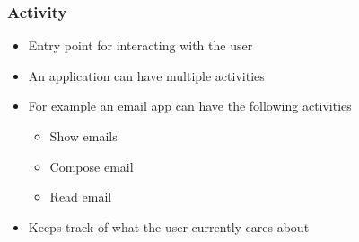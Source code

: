 %
%
%

\begin{frame}
  \frametitle{Activity}
  
  \begin{itemize}
  \item<1-> Entry point for interacting with the user
  \item<2-> An application can have multiple activities
  
  \item<2->[] For example an email app can have the following activities 
    \begin{itemize}
    \item Show emails
    \item Compose email
    \item Read email
    \end{itemize}
        
  \item<3-> Keeps track of what the user currently cares about

  \end{itemize}

\end{frame}


